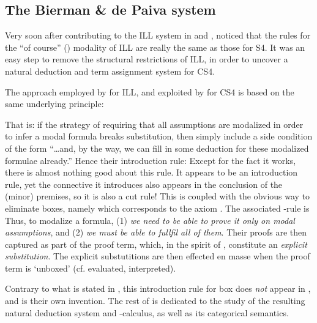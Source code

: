 \documentclass[a4paper]{amsart}
\begin{document}
\subsection{The Bierman \& de Paiva system}

Very soon after contributing to the \textsf{ILL} system in
\cite{Bierman1992} and \cite{Benton1993b}, \cite{Bierman1992a,
Bierman1996a, Bierman2000a} noticed that the rules for the ``of
course'' () modality of \textsf{ILL} are really the same as those for
\textsf{S4}. It was an easy step to remove the structural
restrictions of \textsf{ILL}, in order to uncover a natural deduction and
term assignment system for \textsf{CS4}.

The approach employed by \cite{Benton1993b} for \textsf{ILL}, and exploited
by \cite{Bierman1992a} for \textsf{CS4} is based on the same
underlying principle: \begin{center}
\end{center} That is: if the strategy of requiring that all
assumptions are modalized in order to infer a modal formula breaks
substitution, then simply include a side condition of the form
``\dots and, by the way, we can fill in some deduction for these
modalized formulae already.'' Hence their introduction rule:  Except for the fact it works, there is almost
nothing good about this rule. It appears to be an introduction
rule, yet the connective it introduces also appears in the
conclusion of the (minor) premises, so it is also a cut rule! This
is coupled with the obvious way to eliminate boxes, namely  which corresponds to the axiom . The associated -rule is  Thus, to modalize a formula, (1) \emph{we need to be able to
prove it only on modal assumptions}, and (2) \emph{we must be able
to fullfil all of them}. Their proofs are then captured as part of
the proof term, which, in the spirit of \cite{Abadi1991},
constitute an \emph{explicit substitution}. The explicit
substutitions are then effected en masse when the proof term is
`unboxed' (cf. evaluated, interpreted).

Contrary to what is stated in \citep{Bierman2000a}, this
introduction rule for box does \emph{not} appear in
\citep{Satre1972}, and is their own invention. The rest of
\citep{Bierman2000a} is dedicated to the study of the resulting
natural deduction system and -calculus, as well as its
categorical semantics.
\end{document}
